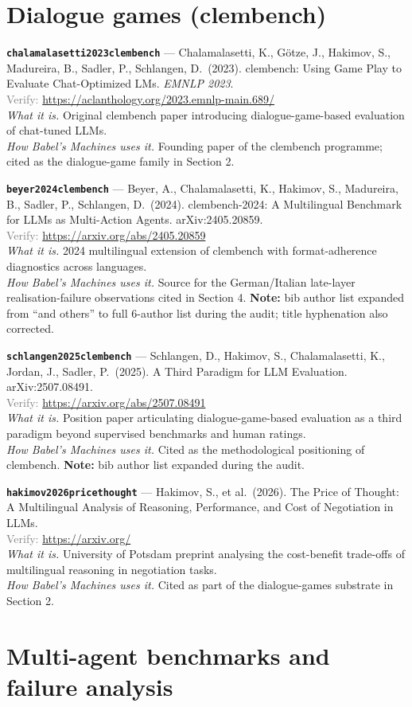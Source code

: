 \documentclass[11pt,a4paper]{article}
\newcommand{\entry}[5]{%
  \par\smallskip
  \noindent\textbf{\texttt{#1}} --- #2\\
  {\footnotesize \textcolor{gray}{Verify:} \url{#3}}\\
  \textit{What it is.} #4\\
  \textit{How Babel's Machines uses it.} #5
  \par\medskip
}
\begin{document}
\section{Dialogue games (clembench)}

\entry{chalamalasetti2023clembench}
{Chalamalasetti, K., G\"otze, J., Hakimov, S., Madureira, B., Sadler, P., Schlangen, D.\ (2023). clembench: Using Game Play to Evaluate Chat-Optimized LMs. \emph{EMNLP 2023}.}
{https://aclanthology.org/2023.emnlp-main.689/}
{Original clembench paper introducing dialogue-game-based evaluation of chat-tuned LLMs.}
{Founding paper of the clembench programme; cited as the dialogue-game family in Section 2.}

\entry{beyer2024clembench}
{Beyer, A., Chalamalasetti, K., Hakimov, S., Madureira, B., Sadler, P., Schlangen, D.\ (2024). clembench-2024: A Multilingual Benchmark for LLMs as Multi-Action Agents. arXiv:2405.20859.}
{https://arxiv.org/abs/2405.20859}
{2024 multilingual extension of clembench with format-adherence diagnostics across languages.}
{Source for the German/Italian late-layer realisation-failure observations cited in Section 4. \textbf{Note:} bib author list expanded from ``and others'' to full 6-author list during the audit; title hyphenation also corrected.}

\entry{schlangen2025clembench}
{Schlangen, D., Hakimov, S., Chalamalasetti, K., Jordan, J., Sadler, P.\ (2025). A Third Paradigm for LLM Evaluation. arXiv:2507.08491.}
{https://arxiv.org/abs/2507.08491}
{Position paper articulating dialogue-game-based evaluation as a third paradigm beyond supervised benchmarks and human ratings.}
{Cited as the methodological positioning of clembench. \textbf{Note:} bib author list expanded during the audit.}

\entry{hakimov2026pricethought}
{Hakimov, S., et al.\ (2026). The Price of Thought: A Multilingual Analysis of Reasoning, Performance, and Cost of Negotiation in LLMs.}
{https://arxiv.org/}
{University of Potsdam preprint analysing the cost-benefit trade-offs of multilingual reasoning in negotiation tasks.}
{Cited as part of the dialogue-games substrate in Section 2.}

\section{Multi-agent benchmarks and failure analysis}
\end{document}
